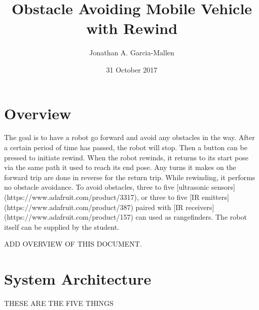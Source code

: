 \documentclass{article}
\title{Obstacle Avoiding Mobile Vehicle with Rewind}
\author{Jonathan A. Garcia-Mallen}
\date{31 October 2017}
\begin{document}
\maketitle

\section*{Overview} 
The goal is to have a robot go forward and avoid any obstacles in the way. After a certain period of time has passed, the robot will stop. Then a button can be pressed to initiate rewind. When the robot rewinds, it returns to its start pose via the same path it used to reach its end pose. Any turns it makes on the forward trip are done in reverse for the return trip. While rewinding, it performs no obstacle avoidance. To avoid obstacles, three to five [ultrasonic sensors](https://www.adafruit.com/product/3317), or three to five [IR emitters](https://www.adafruit.com/product/387) paired with [IR receivers](https://www.adafruit.com/product/157) can used as rangefinders. The robot itself can be supplied by the student.   

ADD OVERVIEW OF THIS DOCUMENT. 
\section*{System Architecture} 
THESE ARE THE FIVE THINGS
\end{document}
